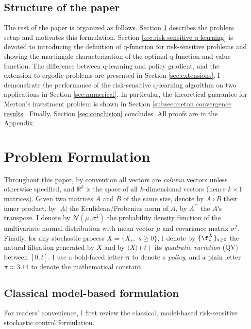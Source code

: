 \subsection*{Structure of the paper}
The rest of the paper is organized as follows. Section \ref{sec:setup} describes the problem setup and motivates this formulation. Section \ref{sec:risk sensitive q learning} is devoted to introducing the definition of q-function for risk-sensitive problems and showing the martingale characterization of the optimal q-function and value function. The difference between q-learning and policy gradient, and the extension to ergodic problems are presented in Section \ref{sec:extensions}. I demonstrate the performance of the risk-sensitive q-learning algorithm on two applications in Section \ref{sec:numerical}. In particular, the theoretical guarantee for Merton's investment problem is shown in Section \ref{subsec:meton convergence results}. Finally, Section \ref{sec:conclusion} concludes. All proofs are in the Appendix.  
\section{Problem Formulation}
\label{sec:setup}

Throughout this paper, by convention all vectors are {\it column} vectors unless otherwise specified, and $\mathbb{R}^k$ is the space of all $k$-dimensional vectors (hence $k\times 1$ matrices). Given two matrices $A$ and $B$ of the same size, denote by $A \circ B$ their inner product, by $|A|$ the Eculidean/Frobenius norm of $A$, by $A^\top$ the $A$'s transpose. I denote by $\mathcal{N}(\mu,\sigma^2)$ the probability density function of the multivariate normal distribution with mean vector $\mu$ and covariance matrix $\sigma^2$. Finally,
for any stochastic process $X=\{X_{s},$ $s\geq 0\}$, I denote by $\{\f^X_s\}_{s\geq 0}$ the natural filtration generated by $X$ and by $\langle X \rangle(t)$ its \textit{quadratic variation} (QV) between $[0,t]$. I use a bold-faced letter $\bm\pi$ to denote a \textit{policy}, and a plain letter $\pi \approx 3.14$ to denote the mathematical constant.


\subsection{Classical model-based formulation}
\label{sec:classical formulation}
For readers' convenience, I first review the classical, model-based risk-sensitive stochastic control formulation.

